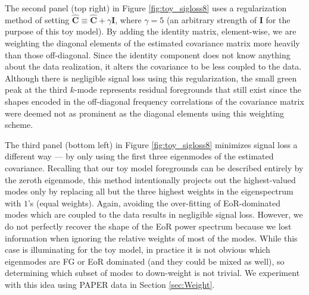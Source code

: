 \documentclass[preprint2,numberedappendix,tighten]{aastex6}  %
\begin{document}
%
The second panel (top right) in Figure \ref{fig:toy_sigloss8} uses a regularization method of setting $\widehat{\textbf{C}} \equiv 
\widehat{\textbf{C}} + \gamma\textbf{I}$, where $\gamma = 5$ (an arbitrary strength 
of $\textbf{I}$ for the purpose of this toy model). By adding the identity matrix, element-wise, we are weighting the diagonal 
elements of the estimated covariance matrix more heavily than those off-diagonal. Since the identity component does not know anything about the data realization, it alters the covariance to be less coupled to the data. Although there is negligible signal loss using this regularization, the small green peak at the third $k$-mode represents residual foregrounds that still exist since the shapes encoded in the off-diagonal frequency correlations of the covariance matrix were deemed not as prominent as the diagonal elements using this weighting scheme. 

The third panel (bottom left) in Figure \ref{fig:toy_sigloss8} minimizes signal loss a different way --- 
by only using the first three eigenmodes of the estimated covariance. Recalling that our toy model foregrounds can be described entirely by the zeroth eigenmode, this 
method intentionally projects out the highest-valued modes only by replacing all but the three highest weights in the 
eigenspectrum with $1$'s (equal weights). Again, avoiding the over-fitting of EoR-dominated modes which are coupled to the data results in negligible signal loss. However, we do 
not perfectly recover the shape of the EoR power spectrum because we lost information when ignoring the relative weights of most of the modes. While this case is illuminating for the toy model, in practice it is not obvious which eigenmodes are FG or EoR dominated (and they could be mixed as well), so determining which subset of modes to down-weight is not trivial. We experiment with this idea using PAPER data in Section \ref{sec:Weight}.
\end{document}
